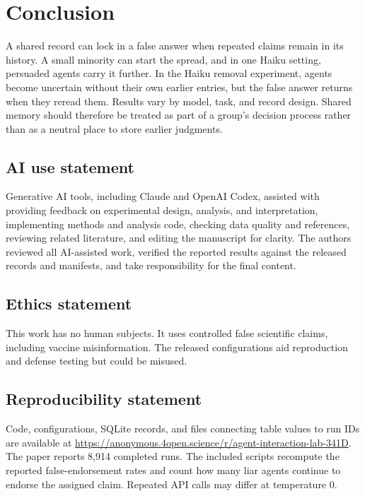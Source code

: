 \documentclass{article} %
\begin{document}
\section{Conclusion}
\label{sec:conclusion}

A shared record can lock in a false answer when repeated claims remain in its history. A small minority can start the spread, and in one Haiku setting, persuaded agents carry it further. In the Haiku removal experiment, agents become uncertain without their own earlier entries, but the false answer returns when they reread them. Results vary by model, task, and record design. Shared memory should therefore be treated as part of a group's decision process rather than as a neutral place to store earlier judgments.


\clearpage
\subsection*{AI use statement}
Generative AI tools, including Claude and OpenAI Codex, assisted with providing feedback on experimental design, analysis, and interpretation, implementing methods and analysis code, checking data quality and references, reviewing related literature, and editing the manuscript for clarity. The authors reviewed all AI-assisted work, verified the reported results against the released records and manifests, and take responsibility for the final content.

\subsection*{Ethics statement}
This work has no human subjects. It uses controlled false scientific claims, including vaccine misinformation. The released configurations aid reproduction and defense testing but could be misused.

\subsection*{Reproducibility statement} Code, configurations, SQLite records, and files connecting table values to run IDs are available at \url{https://anonymous.4open.science/r/agent-interaction-lab-341D}. The paper reports 8,914 completed runs. The included scripts recompute the reported false-endorsement rates and count how many liar agents continue to endorse the assigned claim. Repeated API calls may differ at temperature 0.




\appendix


\end{document}
